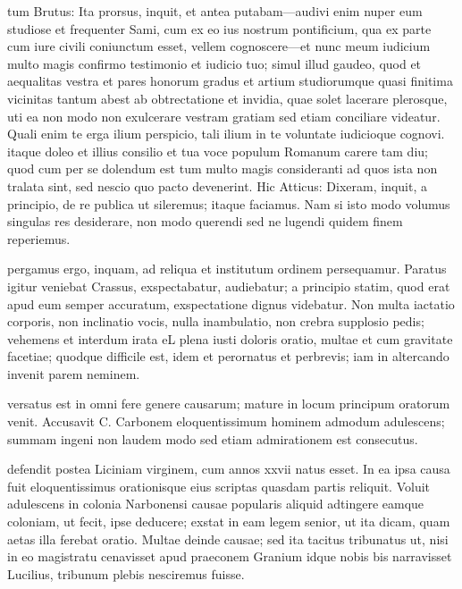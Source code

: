  tum Brutus: Ita prorsus, inquit, et antea putabam—audivi enim nuper eum studiose et frequenter Sami, cum ex eo ius nostrum pontificium, qua ex parte cum iure civili coniunctum esset, vellem cognoscere—et nunc meum iudicium multo magis confirmo testimonio et iudicio tuo; simul illud gaudeo, quod et aequalitas vestra et pares honorum gradus et artium studiorumque quasi finitima vicinitas tantum abest ab obtrectatione et invidia, quae solet lacerare plerosque, uti ea non modo non exulcerare vestram gratiam sed etiam conciliare videatur. Quali enim te erga ilium perspicio, tali ilium in te voluntate iudicioque cognovi. itaque doleo et illius consilio et tua voce populum Romanum carere tam diu; quod cum per se dolendum est tum multo magis consideranti ad quos ista non tralata sint, sed nescio quo pacto devenerint. Hic Atticus: Dixeram, inquit, a principio, de re publica ut sileremus; itaque faciamus. Nam si isto modo volumus singulas res desiderare, non modo querendi sed ne lugendi quidem finem reperiemus.

 pergamus ergo, inquam, ad reliqua et institutum ordinem persequamur. Paratus igitur veniebat Crassus, exspectabatur, audiebatur; a principio statim, quod erat apud eum semper accuratum, exspectatione dignus videbatur. Non multa iactatio corporis, non inclinatio vocis, nulla inambulatio, non crebra supplosio pedis; vehemens et interdum irata eL plena iusti doloris oratio, multae et cum gravitate facetiae; quodque difficile est, idem et perornatus et perbrevis; iam in altercando invenit parem neminem.

 versatus est in omni fere genere causarum; mature in locum principum oratorum venit. Accusavit C. Carbonem eloquentissimum hominem admodum adulescens; summam ingeni non laudem modo sed etiam admirationem est consecutus.

 defendit postea Liciniam virginem, cum annos xxvii natus esset. In ea ipsa causa fuit eloquentissimus orationisque eius scriptas quasdam partis reliquit. Voluit adulescens in colonia Narbonensi causae popularis aliquid adtingere eamque coloniam, ut fecit, ipse deducere; exstat in eam legem senior, ut ita dicam, quam aetas illa ferebat oratio. Multae deinde causae; sed ita tacitus tribunatus ut, nisi in eo magistratu cenavisset apud praeconem Granium idque nobis bis narravisset Lucilius, tribunum plebis nesciremus fuisse.


